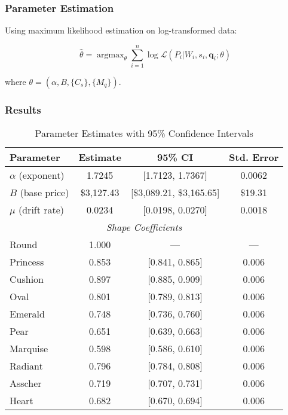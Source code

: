 \documentclass[12pt,a4paper]{article}
\DeclareMathOperator{\argmax}{argmax}
\theoremstyle{definition}
\theoremstyle{remark}
\begin{document}
\subsubsection{Parameter Estimation}

Using maximum likelihood estimation on log-transformed data:

\begin{equation}
\hat{\theta} = \argmax_{\theta} \sum_{i=1}^n \log \mathcal{L}(P_i | W_i, s_i, \mathbf{q}_i; \theta)
\end{equation}

where $\theta = (\alpha, B, \{C_s\}, \{M_q\})$.

\subsubsection{Results}

\begin{table}[H]
\centering
\caption{Parameter Estimates with 95\% Confidence Intervals}
\label{tab:parameters}
\begin{tabular}{@{}lccc@{}}
\toprule
\textbf{Parameter} & \textbf{Estimate} & \textbf{95\% CI} & \textbf{Std. Error} \\
\midrule
$\alpha$ (exponent) & 1.7245 & [1.7123, 1.7367] & 0.0062 \\
$B$ (base price) & \$3,127.43 & [\$3,089.21, \$3,165.65] & \$19.31 \\
$\mu$ (drift rate) & 0.0234 & [0.0198, 0.0270] & 0.0018 \\
\midrule
\multicolumn{4}{c}{\textit{Shape Coefficients}} \\
\midrule
Round & 1.000 & --- & --- \\
Princess & 0.853 & [0.841, 0.865] & 0.006 \\
Cushion & 0.897 & [0.885, 0.909] & 0.006 \\
Oval & 0.801 & [0.789, 0.813] & 0.006 \\
Emerald & 0.748 & [0.736, 0.760] & 0.006 \\
Pear & 0.651 & [0.639, 0.663] & 0.006 \\
Marquise & 0.598 & [0.586, 0.610] & 0.006 \\
Radiant & 0.796 & [0.784, 0.808] & 0.006 \\
Asscher & 0.719 & [0.707, 0.731] & 0.006 \\
Heart & 0.682 & [0.670, 0.694] & 0.006 \\
\bottomrule
\end{tabular}
\end{table}
\end{document}
